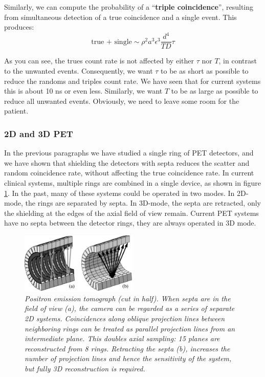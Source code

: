 \documentclass[11pt,oneside]{book}
\begin{document}
Similarly, we can compute the probability of a ``{\bf triple coincidence}'',
resulting from simultaneous detection of a true coincidence and a single
event. This produces:
\begin{equation}
  \mbox{true + single} \sim \rho^2 a^3 \epsilon^3 \frac{d^4}{TD} \tau
\end{equation}

As you can see, the trues count rate is not affected by either $\tau$
nor $T$, in contrast to the unwanted events. Consequently, we want
$\tau$ to be as short as possible to reduce the randoms and triples
count rate. We have seen that for current systems this is about 10 ns
or even less. Similarly, we want $T$ to be as large as possible to
reduce all unwanted events. Obviously, we need to leave some room for
the patient.


\subsubsection{2D and 3D PET} \label{sec:2D3DPET}
In the previous paragraphs we have studied a single ring of PET
detectors, and we have shown that shielding the detectors with septa
reduces the scatter and random coincidence rate, without affecting the
true coincidence rate. In current clinical systems, multiple rings are
combined in a single device, as shown in figure \ref{fig:jnpet}. In
the past, many of these systems could be operated in two modes.  In
2D-mode, the rings are separated by septa. In 3D-mode, the septa are
retracted, only the shielding at the edges of the axial field of view
remain. Current PET systems have no septa between the detector rings,
they are always operated in 3D mode.

\begin{figure}[tb]
\centering
\includegraphics[width=0.5\textwidth]{figs/fig_jnpet.pdf}
\caption{\label{fig:jnpet} \emph{Positron emission tomograph (cut in
half). When septa are in the field of view (a), the camera can be regarded as
a series of separate 2D systems. Coincidences along oblique projection lines
between neighboring rings can be treated as parallel projection lines from an
intermediate plane. This doubles axial sampling: 15 planes are reconstructed
from 8 rings. Retracting the septa (b), increases the number of projection
lines and hence the sensitivity of the system, but fully 3D reconstruction is
required.}}
\end{figure}
\end{document}
